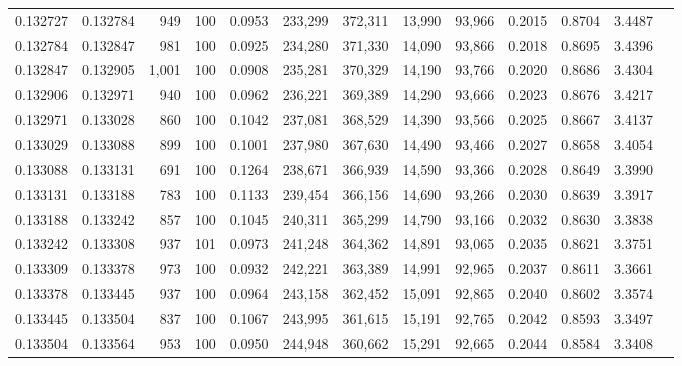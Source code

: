 \begin{tabular}{rrrrrrrrrrrrr}
0.132727 & 0.132784 &   949 & 100 &                                     0.0953 & 233,299 & 372,311 &  13,990 &  93,966 & 0.2015 & 0.8704 & 3.4487 \\
0.132784 & 0.132847 &   981 & 100 &                                     0.0925 & 234,280 & 371,330 &  14,090 &  93,866 & 0.2018 & 0.8695 & 3.4396 \\
0.132847 & 0.132905 & 1,001 & 100 &                                     0.0908 & 235,281 & 370,329 &  14,190 &  93,766 & 0.2020 & 0.8686 & 3.4304 \\
0.132906 & 0.132971 &   940 & 100 &                                     0.0962 & 236,221 & 369,389 &  14,290 &  93,666 & 0.2023 & 0.8676 & 3.4217 \\
0.132971 & 0.133028 &   860 & 100 &                                     0.1042 & 237,081 & 368,529 &  14,390 &  93,566 & 0.2025 & 0.8667 & 3.4137 \\
0.133029 & 0.133088 &   899 & 100 &                                     0.1001 & 237,980 & 367,630 &  14,490 &  93,466 & 0.2027 & 0.8658 & 3.4054 \\
0.133088 & 0.133131 &   691 & 100 &                                     0.1264 & 238,671 & 366,939 &  14,590 &  93,366 & 0.2028 & 0.8649 & 3.3990 \\
0.133131 & 0.133188 &   783 & 100 &                                     0.1133 & 239,454 & 366,156 &  14,690 &  93,266 & 0.2030 & 0.8639 & 3.3917 \\
0.133188 & 0.133242 &   857 & 100 &                                     0.1045 & 240,311 & 365,299 &  14,790 &  93,166 & 0.2032 & 0.8630 & 3.3838 \\
0.133242 & 0.133308 &   937 & 101 &                                     0.0973 & 241,248 & 364,362 &  14,891 &  93,065 & 0.2035 & 0.8621 & 3.3751 \\
0.133309 & 0.133378 &   973 & 100 &                                     0.0932 & 242,221 & 363,389 &  14,991 &  92,965 & 0.2037 & 0.8611 & 3.3661 \\
0.133378 & 0.133445 &   937 & 100 &                                     0.0964 & 243,158 & 362,452 &  15,091 &  92,865 & 0.2040 & 0.8602 & 3.3574 \\
0.133445 & 0.133504 &   837 & 100 &                                     0.1067 & 243,995 & 361,615 &  15,191 &  92,765 & 0.2042 & 0.8593 & 3.3497 \\
0.133504 & 0.133564 &   953 & 100 &                                     0.0950 & 244,948 & 360,662 &  15,291 &  92,665 & 0.2044 & 0.8584 & 3.3408 \\

\end{tabular}
